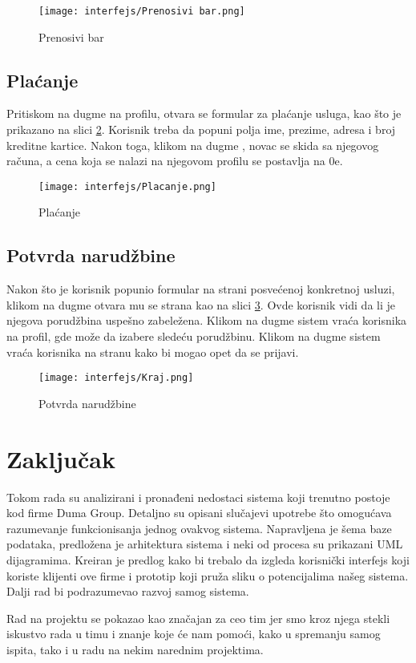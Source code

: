 \documentclass[a4paper]{article}
\begin{document}
\begin{figure}[H]
    \centering
    \texttt{[image: interfejs/Prenosivi bar.png]}
    \caption{Prenosivi bar}
    \label{fig:ki_prenosivibar}
\end{figure}

\subsection{Plaćanje}

Pritiskom na dugme  na profilu, otvara se formular za plaćanje usluga, kao što je prikazano na slici \ref{fig:ki_placanje}. Korisnik treba da popuni polja ime, prezime, adresa i broj kreditne kartice. Nakon toga, klikom na dugme , novac se skida sa njegovog računa, a cena koja se nalazi na njegovom profilu se postavlja na 0e.  

\begin{figure}[H]
    \centering
    \texttt{[image: interfejs/Placanje.png]}
    \caption{Plaćanje}
    \label{fig:ki_placanje}
\end{figure}

\subsection{Potvrda narudžbine}

Nakon što je korisnik popunio formular na strani posvećenoj konkretnoj usluzi, klikom na dugme  otvara mu se strana kao na slici \ref{fig:ki_kraj}. Ovde korisnik vidi da li je njegova porudžbina uspešno zabeležena. Klikom na dugme  sistem vraća korisnika na profil, gde može da izabere sledeću porudžbinu. Klikom na dugme  sistem vraća korisnika na stranu  kako bi mogao opet da se prijavi.

\begin{figure}[H]
    \centering
    \texttt{[image: interfejs/Kraj.png]}
    \caption{Potvrda narudžbine}
    \label{fig:ki_kraj}
\end{figure}

\section{Zaključak}

Tokom rada su analizirani i pronađeni nedostaci sistema koji trenutno postoje kod firme Duma Group. Detaljno su opisani slučajevi upotrebe što omogućava razumevanje funkcionisanja jednog ovakvog sistema. Napravljena je šema baze podataka, predložena je arhitektura sistema i neki od procesa su prikazani UML dijagramima. Kreiran je predlog kako bi trebalo da izgleda korisnički interfejs koji koriste klijenti ove firme i prototip koji pruža sliku o potencijalima našeg sistema. Dalji rad bi podrazumevao razvoj samog sistema. 

Rad na projektu se pokazao kao značajan za ceo tim jer smo kroz njega stekli iskustvo rada u timu i znanje koje će nam pomoći, kako u spremanju samog ispita, tako i u radu na nekim narednim projektima. 
\end{document}
